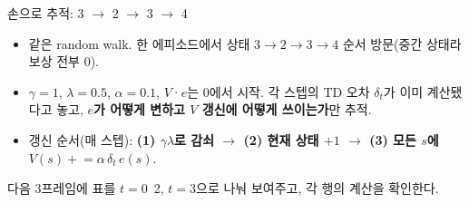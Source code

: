 \begin{frame}{손으로 추적: 3 $\to$ 2 $\to$ 3 $\to$ 4}
  \begin{itemize}
    \item 같은 random walk. 한 에피소드에서 상태
      $3 \to 2 \to 3 \to 4$ 순서 방문(중간 상태라 보상 전부 0).
    \item $\gamma=1$, $\lambda=0.5$, $\alpha=0.1$, $V$·$e$는 0에서
      시작. 각 스텝의 TD 오차 $\delta_t$가 이미 계산됐다고 놓고,
      \textbf{$e$가 어떻게 변하고 $V$ 갱신에 어떻게 쓰이는가}만
      추적.
    \item 갱신 순서(매 스텝): \textbf{(1) $\gamma\lambda$로 감쇠
      $\to$ (2) 현재 상태 $+1$ $\to$ (3) 모든 $s$에
      $V(s) \mathrel{+}= \alpha\,\delta_t\,e(s)$}.
  \end{itemize}
  {\footnotesize 다음 3프레임에 표를 $t=0$~2, $t=3$으로 나눠
  보여주고, 각 행의 계산을 확인한다.}
\end{frame}
